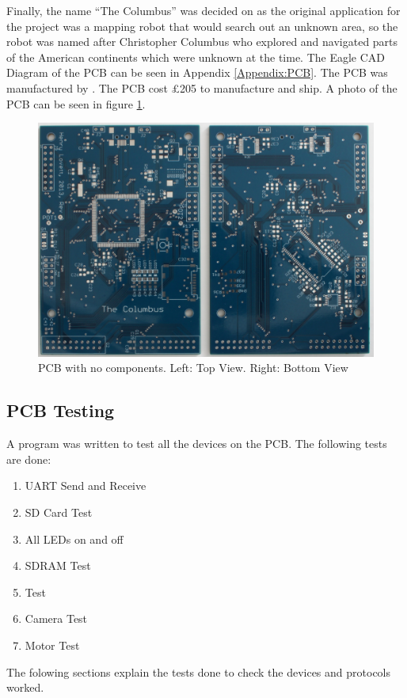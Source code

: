 Finally, the name ``The Columbus'' was decided on as the original application for the project was a mapping robot that would search out an unknown area, so the robot was named after Christopher Columbus who explored and navigated parts of the American continents which were unknown at the time. The Eagle CAD Diagram of the PCB can be seen in Appendix \ref{Appendix:PCB}. The PCB was manufactured by \cite{PCBCart}. The PCB cost \pounds 205 to manufacture and ship. A photo of the PCB can be seen in figure \ref{fig:PCB:Bare}. 

\begin{figure}
\includegraphics[width=\textwidth]{./Figures/PCB_Bare.jpg}
\caption{PCB with no components. Left: Top View. Right: Bottom View}
\label{fig:PCB:Bare}
\end{figure}


\subsection{PCB Testing}
A program was written to test all the devices on the PCB. The following tests are done:
\begin{enumerate}
\item UART Send and Receive
\item SD Card Test
\item All LEDs on and off
\item SDRAM Test
\item \itc Test
\item Camera Test
\item Motor Test
\end{enumerate}
The folowing sections explain the tests done to check the devices and protocols worked.

